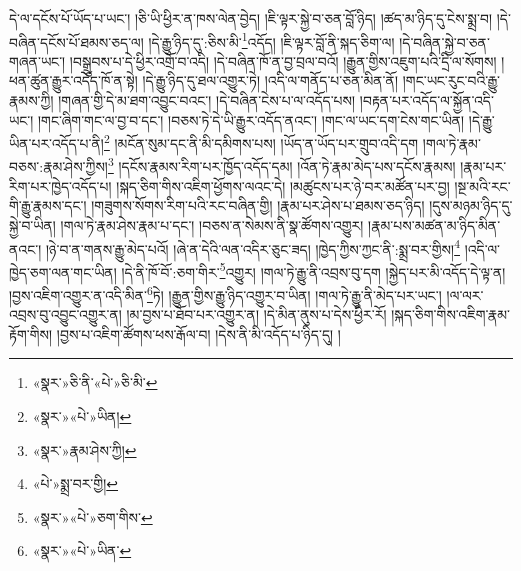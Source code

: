 དེ་ལ་དངོས་པོ་ཡོད་པ་ཡང་། །ཅི་ཡི་ཕྱིར་ན་ཁས་ལེན་བྱེད། །ཇི་ལྟར་སྐྱེ་བ་ཅན་བློ་ཉིད། །ཚད་མ་ཉིད་དུ་ངེས་སྨྲ་བ། །དེ་བཞིན་དངོས་པོ་ཐམས་ཅད་ལ། །དེ་རྒྱུ་ཉིད་དུ་:ཅིས་མི་\footnote{«སྣར་»ཅི་ནི་«པེ་»ཅི་མི་}འདོད། །ཇི་ལྟར་བློ་ནི་སྐད་ཅིག་ལ། །དེ་བཞིན་སྐྱེ་བ་ཅན་གཞན་ཡང་། །བསྒྲུབས་པ་དེ་ཕྱིར་འགྲོ་བ་འདི། །དེ་བཞིན་ཁོ་ན་བྱ་བྲལ་བའོ། །རྒྱུན་གྱིས་འཇུག་པའི་དྲི་ལ་སོགས། །ཕན་ཚུན་རྒྱུར་འདོད་ཁོ་ན་སྟེ། །དེ་རྒྱུ་ཉིད་དུ་ཐལ་འགྱུར་ཏེ། །འདི་ལ་གནོད་པ་ཅན་མིན་ནོ། །གང་ཡང་རུང་བའི་རྒྱུ་རྣམས་ཀྱི། །གཞན་གྱི་དེ་མ་ཐག་འབྱུང་བའང་། །དེ་བཞིན་ངེས་པ་ལ་འདོད་པས། །བརྟན་པར་འདོད་ལ་སྐྱོན་འདི་ཡང་། །གང་ཞིག་གང་ལ་བྱ་བ་དང་། །བཅས་ཏེ་དེ་ཡི་རྒྱུར་འདོད་ནའང་། །གང་ལ་ཡང་དག་ངེས་གང་ཡིན། །དེ་རྒྱུ་ཡིན་པར་འདོད་པ་ནི།\footnote{«སྣར་»«པེ་»ཡིན།} །མངོན་སུམ་དང་ནི་མི་དམིགས་པས། །ཡོད་ན་ཡོད་པར་གྲུབ་འདི་དག །གལ་ཏེ་རྣམ་བཅས་:རྣམ་ཤེས་ཀྱིས།\footnote{«སྣར་»རྣམ་ཤེས་ཀྱི།} །དངོས་རྣམས་རིག་པར་ཁྱོད་འདོད་དམ། །འོན་ཏེ་རྣམ་མེད་པས་དངོས་རྣམས། །རྣམ་པར་རིག་པར་ཁྱེད་འདོད་པ། །སྐད་ཅིག་གིས་འཇིག་ཕྱོགས་ལའང་དེ། །མཚུངས་པར་ཉེ་བར་མཚོན་པར་བྱ། །སྔ་མའི་རང་གི་རྒྱུ་རྣམས་དང་། །གཟུགས་སོགས་རིག་པའི་རང་བཞིན་གྱི། །རྣམ་པར་ཤེས་པ་ཐམས་ཅད་ཉིད། །དུས་མཉམ་ཉིད་དུ་སྐྱེ་བ་ཡིན། །གལ་ཏེ་རྣམ་ཤེས་རྣམ་པ་དང་། །བཅས་ན་སེམས་ནི་སྣ་ཚོགས་འགྱུར། །རྣམ་པས་མཚན་མ་ཉིད་མིན་ནའང་། །ཉེ་བ་ན་གནས་རྒྱུ་མེད་པའོ། །ཞེ་ན་དེའི་ལན་འདིར་ཅུང་ཟད། །ཁྱེད་ཀྱིས་ཀྱང་ནི་:སྨྲ་བར་གྱིས།\footnote{«པེ་»སྨྲ་བར་གྱི།} །འདི་ལ་ཁྱེད་ཅག་ལན་གང་ཡིན། །དེ་ནི་ཁོ་བོ་:ཅག་གིར་\footnote{«སྣར་»«པེ་»ཅག་གིས་}འགྱུར། །གལ་ཏེ་རྒྱུ་ནི་འབྲས་བུ་དག །སྐྱེད་པར་མི་འདོད་དེ་ལྟ་ན། །བྱས་འཇིག་འགྱུར་ན་འདི་མིན་\footnote{«སྣར་»«པེ་»ཡིན་}ཏེ། །རྒྱུན་གྱིས་རྒྱུ་ཉིད་འགྱུར་བ་ཡིན། །གལ་ཏེ་རྒྱུ་ནི་མེད་པར་ཡང་། །ལ་ལར་འབྲས་བུ་འབྱུང་འགྱུར་ན། །མ་བྱས་པ་ཐོབ་པར་འགྱུར་ན། །དེ་མིན་ནུས་པ་དེས་ཕྱིར་རོ། །སྐད་ཅིག་གིས་འཇིག་རྣམ་རྟོག་གིས། །བྱས་པ་འཇིག་ཚོགས་ཕས་རྒོལ་བ། །དེས་ནི་མི་འདོད་པ་ཉིད་དུ། །
